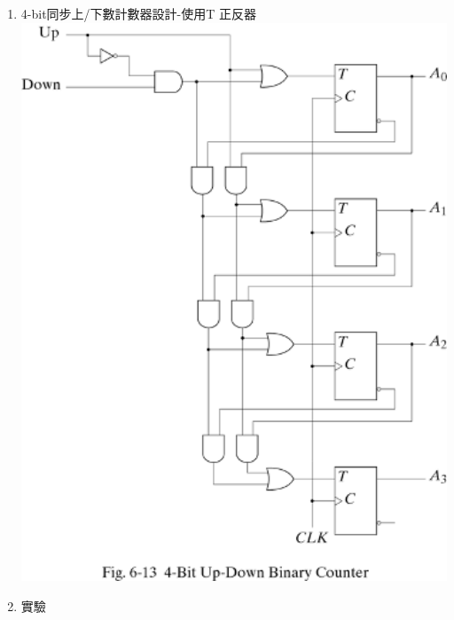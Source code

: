 \documentclass[12pt, a4paper]{article}
\begin{document}
\begin{description}
\begin{enumerate}
          \item 4-bit同步上/下數計數器設計-使用T 正反器 \\
            \includegraphics[width=13cm]{./image/t_flip_flop.png}
            
          \item 實驗 
        \normalsize
      \end{enumerate}


\end{description}
\end{document}
